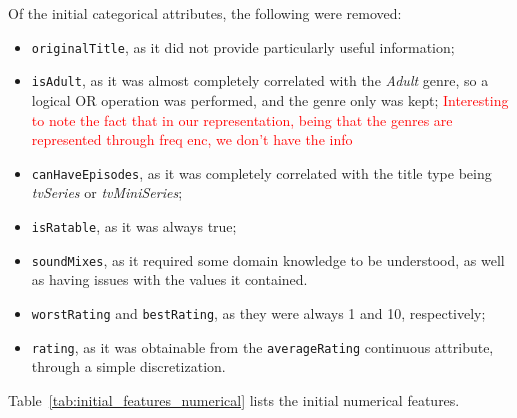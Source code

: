 Of the initial categorical attributes, the following were removed:
\begin{itemize}
    \item \texttt{originalTitle}, as it did not provide particularly useful
    information;
    \item \texttt{isAdult}, as it was almost completely correlated with the
    \textit{Adult} genre, so a logical OR operation was performed, and the genre
    only was kept;
    \textcolor{red}{Interesting to note the fact that in our representation, being that
        the genres are represented through freq enc, we don't have the info}
    \item \texttt{canHaveEpisodes}, as it was completely correlated with the title type
    being \textit{tvSeries} or \textit{tvMiniSeries};
    \item \texttt{isRatable}, as it was always true;
    \item \texttt{soundMixes}, as it required some domain knowledge to be understood, as well as having issues with the values it contained.
    \item \texttt{worstRating} and \texttt{bestRating}, as they were always
    1 and 10, respectively;
    \item \texttt{rating}, as it was obtainable from the \texttt{averageRating}
    continuous attribute, through a simple discretization.
\end{itemize}


Table~\ref{tab:initial_features_numerical} lists the initial numerical features.


